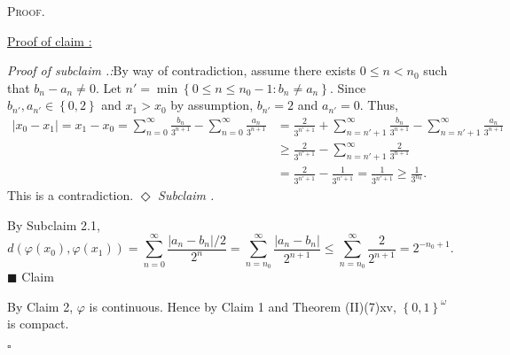 \documentclass[12pt]{article}
\newcounter{ProofCounter}
\newcounter{ClaimCounter}[ProofCounter]
\newcounter{SubClaimCounter}[ClaimCounter]
\newenvironment{Proof}{\stepcounter{ProofCounter}\textsc{Proof.}}{\hfill$\square$}
\newenvironment{claimproof}[1]{\par\noindent\underline{Proof of claim \theClaimCounter:}\space#1}{\hfill $\blacksquare$ Claim \theClaimCounter}
\newenvironment{subclaim}[1]{\stepcounter{SubClaimCounter}\par\noindent\emph{Subclaim \theClaimCounter.\theSubClaimCounter:}\space#1}{}
\newenvironment{subclaimproof}[1]{\par\noindent\emph{Proof of subclaim \theClaimCounter.\theSubClaimCounter:}\space#1}{\hfill
$\Diamond$ \emph{Subclaim \theClaimCounter.\theSubClaimCounter}}
\begin{document}
\begin{Proof}
\begin{claimproof}
    \begin{subclaimproof}
      By way of contradiction, assume there exists $0 \leq n< n_{0}$ such that $b_{n} - a_{n} \neq 0$. Let $n' = \min\left\{ 0 \leq n \leq n_0 -1 :
      b_{n} \neq a_{n} \right\}$. Since $b_{n'}, a_{n'} \in \left\{ 0,2 \right\}$ and $x_{1} > x_{0}$ by assumption, $b_{n'} = 2$ and $a_{n'} = 0$. Thus,
      \begin{align*}
        |x_{0} - x_{1}| = x_{1} - x_{0} = \sum_{n=0}^{\infty}\frac{b_{n}}{3^{n+1}} - \sum_{n=0}^{\infty}\frac{a_{n}}{3^{n+1}}
        & = \frac{2}{3^{n'+1}} + \sum_{n=n'+1}^{\infty}\frac{b_{n}}{3^{n+1}} - \sum_{n=n'+1}^{\infty}\frac{a_{n}}{3^{n+1}} \\
        & \geq \frac{2}{3^{n'+1}} - \sum_{n=n'+1}^{\infty}\frac{2}{3^{n+1}} \\
        & = \frac{2}{3^{n'+1}} - \frac{1}{3^{n'+1}} = \frac{1}{3^{n'+1}} \geq \frac{1}{3^{n_{0}}}.
      \end{align*}
      This is a contradiction.
    \end{subclaimproof}

    By Subclaim 2.1,
    \[ d(\varphi(x_0), \varphi(x_1)) = \sum_{n=0}^{\infty}\frac{|a_n - b_n|/2}{2^{n}} = \sum_{n=n_0}^{\infty}\frac{|a_n - b_n|}{2^{n+1}} \leq
    \sum_{n=n_0}^{\infty}\frac{2}{2^{n+1}} = 2^{-n_0+1}. \]
  \end{claimproof}

  By Claim 2, $\varphi$ is continuous. Hence by Claim 1 and Theorem (II)(7)xv, $\left\{ 0,1 \right\}^{\omega}$ is compact. %

\end{Proof}
\end{document}
